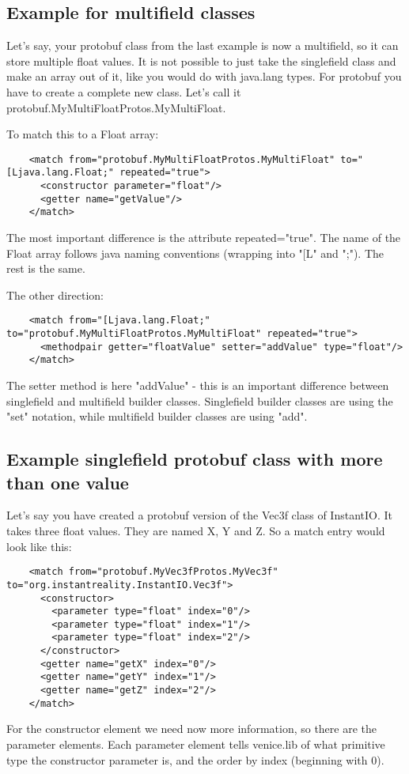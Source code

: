 \documentclass[german,a4paper]{article}
\begin{document}
\subsection{Example for multifield classes}

Let's say, your protobuf class from the last example is now a multifield, so it can store multiple float values.  It is not possible to just take the singlefield class and make an array out of it, like you would do with java.lang types.  For protobuf you have to create a complete new class.  Let's call it protobuf.MyMultiFloatProtos.MyMultiFloat.

To match this to a Float array:
\begin{lstlisting}
    <match from="protobuf.MyMultiFloatProtos.MyMultiFloat" to="[Ljava.lang.Float;" repeated="true">
      <constructor parameter="float"/>
      <getter name="getValue"/>
    </match>
\end{lstlisting}
The most important difference is the attribute repeated="true".  The name of the Float array follows java naming conventions (wrapping into "[L" and ";").  The rest is the same.

The other direction:

\begin{lstlisting}
    <match from="[Ljava.lang.Float;" to="protobuf.MyMultiFloatProtos.MyMultiFloat" repeated="true">
      <methodpair getter="floatValue" setter="addValue" type="float"/>
    </match>
\end{lstlisting}
The setter method is here "addValue" - this is an important difference between singlefield and multifield builder classes.  Singlefield builder classes are using the "set" notation, while multifield builder classes are using "add".\\


\subsection{Example singlefield protobuf class with more than one value}

Let's say you have created a protobuf version of the Vec3f class of InstantIO.  It takes three float values.  They are named X, Y and Z.  So a match entry would look like this:
\begin{lstlisting}
    <match from="protobuf.MyVec3fProtos.MyVec3f" to="org.instantreality.InstantIO.Vec3f">
      <constructor>
        <parameter type="float" index="0"/>
        <parameter type="float" index="1"/>
        <parameter type="float" index="2"/>
      </constructor>
      <getter name="getX" index="0"/>
      <getter name="getY" index="1"/>
      <getter name="getZ" index="2"/>
    </match>
\end{lstlisting}
For the constructor element we need now more information, so there are the parameter elements.  Each parameter element tells venice.lib of what primitive type the constructor parameter is, and the order by index (beginning with 0).
\end{document}

